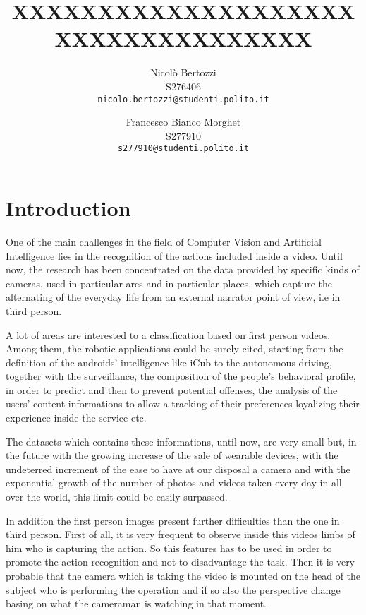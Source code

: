 \documentclass[10pt,twocolumn,letterpaper]{article}
\begin{document}
\title{XXXXXXXXXXXXXXXXXXXXXXXXXXXXXXXXXXX}

\author{Nicolò Bertozzi\\
S276406\\
{\tt\small nicolo.bertozzi@studenti.polito.it}
\and
Francesco Bianco Morghet\\
S277910\\
{\tt\small s277910@studenti.polito.it}
}

\maketitle


\begin{abstract}
\end{abstract}


\section{Introduction}

One of the main challenges in the field of Computer Vision and Artificial Intelligence lies in the recognition of the actions included inside a video. Until now, the research has been concentrated on the data provided by specific kinds of cameras, used in particular ares and in particular places, which capture the alternating of the everyday life from an external narrator point of view, i.e in third person.

A lot of areas are interested to a classification based on first person videos. Among them, the robotic applications could be surely cited, starting from the definition of the androids’ intelligence like iCub\textsuperscript{\textcopyright} to the autonomous driving, together with the surveillance, the composition of the people’s behavioral profile, in order to predict and then to prevent potential offenses, the analysis of the users’ content informations to allow a tracking of their preferences loyalizing their experience inside the service etc.

The datasets which contains these informations, until now, are very small but, in the future with the growing increase of the sale of wearable devices, with the undeterred increment of the ease to have at our disposal a camera and with the exponential growth of the number of photos and videos taken every day in all over the world, this limit could be easily surpassed. 

In addition the first person images present further difficulties than the one in third person. First of all, it is very frequent to observe inside this videos limbs of him who is capturing the action. So this features has to be used in order to promote the action recognition and not to disadvantage the task. Then it is very probable that the camera which is taking the video is mounted on the head of the subject who is performing the operation and if so also the perspective change basing on what the cameraman is watching in that moment.
\end{document}
